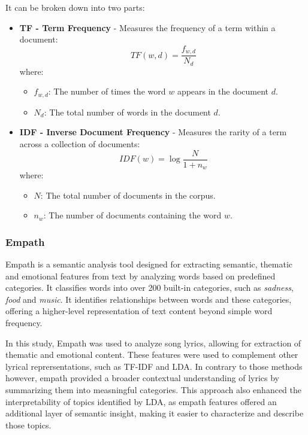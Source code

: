 It can be broken down into two parts:


\begin{itemize}
  \item \textbf{TF - Term Frequency} - Measures the frequency of a term within
    a document:
  \[
  TF(w, d) = \frac{f_{w, d}}{N_d}
  \]
  where:
  \begin{itemize}
    \item \( f_{w, d} \): The number of times the word \( w \) appears in the document \( d \).
    \item \( N_d \): The total number of words in the document \( d \).
  \end{itemize}

  \item \textbf{IDF - Inverse Document Frequency} - Measures the rarity of a
    term across a collection of documents:
  \[
  IDF(w) = \log{\frac{N}{1 + n_w}}
  \]
  where:
  \begin{itemize}
    \item \( N \): The total number of documents in the corpus.
    \item \( n_w \): The number of documents containing the word \( w \).
  \end{itemize}
\end{itemize}


\subsubsection*{Empath}
Empath\cite{empath} is a semantic analysis tool designed for extracting
semantic, thematic and emotional features from text by analyzing words based on
predefined categories. It classifies words into over 200 built-in categories,
such as \textit{sadness}, \textit{food} and \textit{music}. It  identifies
relationships between words and these categories, offering a higher-level
representation of text content beyond simple word frequency.

In this study, Empath was  used to analyze song lyrics, allowing for extraction
of thematic and  emotional content. These features were used to complement
other lyrical reprersentations, such as TF-IDF and LDA. In contrary to those
methods however, empath provided a broader contextual understanding of lyrics
by summarizing them into measningful categories. This approach also enhanced
the interpretability of topics identified by LDA, as empath features offered an
additional layer of semantic insight, making it easier to characterize and
describe those topics.

